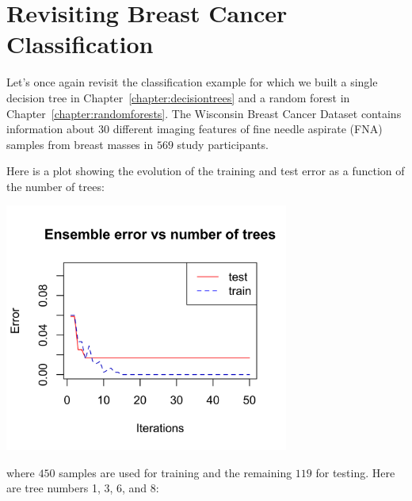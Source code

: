 \newpage


\section{Revisiting Breast Cancer Classification}

Let's once again revisit the classification example for which we built a single decision tree in Chapter~\ref{chapter:decisiontrees} and a random forest in Chapter~\ref{chapter:randomforests}. The Wisconsin Breast Cancer Dataset contains information about $30$ different imaging features of fine needle aspirate (FNA) samples from breast masses in $569$ study participants.

Here is a plot showing the evolution of the training and test error as a function of the number of trees:
\begin{center}
\includegraphics[width=0.7\textwidth]{img/wisconsin-boosting-error.png}
\end{center}
where $450$ samples are used for training and the remaining $119$ for testing. Here are tree numbers 1, 3, 6, and 8:
